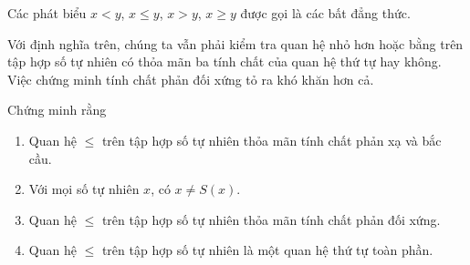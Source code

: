 Các phát biểu $x < y$, $x\leq y$, $x > y$, $x\geq y$ được gọi là các bất đẳng thức.

Với định nghĩa trên, chúng ta vẫn phải kiểm tra quan hệ nhỏ hơn hoặc bằng trên tập hợp số tự nhiên có thỏa mãn ba tính chất của quan hệ thứ tự hay không. Việc chứng minh tính chất phản đối xứng tỏ ra khó khăn hơn cả.

\begin{proposition}
    Chứng minh rằng
    \begin{enumerate}[label={(\roman*)}]
        \item Quan hệ $\leq$ trên tập hợp số tự nhiên thỏa mãn tính chất phản xạ và bắc cầu.
        \item Với mọi số tự nhiên $x$, có $x\ne S(x)$.
        \item Quan hệ $\leq$ trên tập hợp số tự nhiên thỏa mãn tính chất phản đối xứng.
        \item Quan hệ $\leq$ trên tập hợp số tự nhiên là một quan hệ thứ tự toàn phần.
    \end{enumerate}
\end{proposition}

